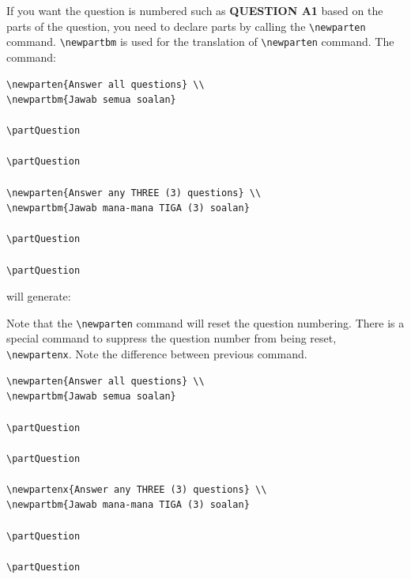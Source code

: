 \documentclass[12pt]{article}
\begin{document}
If you want the question is numbered such as \textbf{QUESTION A1} based on the parts of the question, you need to declare parts by calling the \verb|\newparten| command. \verb|\newpartbm| is used for the translation of \verb|\newparten| command. The command: \clearpage 

\begin{lstlisting}[basicstyle=\footnotesize, frame=single]
\newparten{Answer all questions} \\
\newpartbm{Jawab semua soalan}

\partQuestion

\partQuestion

\newparten{Answer any THREE (3) questions} \\
\newpartbm{Jawab mana-mana TIGA (3) soalan}

\partQuestion

\partQuestion

\end{lstlisting}

will generate: 

\begin{framed}
	
	\medskip
	
	\partQuestion{}
	
	\partQuestion{}
	
	
	\medskip
	
	\partQuestion{}
	
	\partQuestion{}
\end{framed}

Note that the \verb|\newparten| command will reset the question numbering. There is a special command to suppress the question number from being reset, \verb|\newpartenx|. Note the difference between previous command. \medskip 

\begin{lstlisting}[basicstyle=\footnotesize, frame=single]
\newparten{Answer all questions} \\
\newpartbm{Jawab semua soalan}

\partQuestion

\partQuestion

\newpartenx{Answer any THREE (3) questions} \\
\newpartbm{Jawab mana-mana TIGA (3) soalan}

\partQuestion

\partQuestion
\end{lstlisting}
\end{document}
